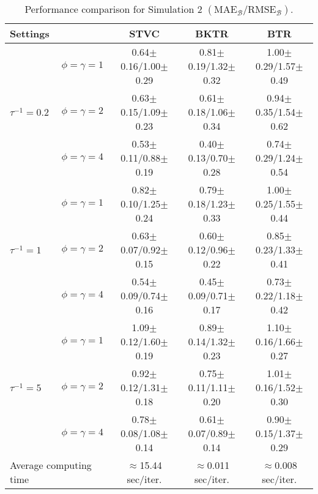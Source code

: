 \documentclass[12pt]{article}
\begin{document}
\begin{table}[!t]
\footnotesize
    \centering
    \caption{{Performance comparison for Simulation 2 $\left(\text{MAE}_{\boldsymbol{\mathcal{B}}}/\text{RMSE}_{\boldsymbol{\mathcal{B}}}\right)$.}}
    \begin{tabular}{ll|ccc}
    \toprule
    Settings & & STVC & BKTR  & BTR \\
    \midrule
    \multirow{3}{*}{$\tau^{-1}=0.2$} & $\phi=\gamma=1$ & 0.64$\pm$0.16/1.00$\pm$0.29 & 0.81$\pm$0.19/1.32$\pm$0.32 & 1.00$\pm$0.29/1.57$\pm$0.49 \\
    & $\phi=\gamma=2$ & 0.63$\pm$0.15/1.09$\pm$0.23 & 0.61$\pm$0.18/1.06$\pm$0.34 & 0.94$\pm$0.35/1.54$\pm$0.62  \\
    & $\phi=\gamma=4$ & 0.53$\pm$0.11/0.88$\pm$0.19 & 0.40$\pm$0.13/0.70$\pm$0.28 & 0.74$\pm$0.29/1.24$\pm$0.54 \\
    \cmidrule(r){1-5}
    \multirow{3}{*}{$\tau^{-1}=1$} & $\phi=\gamma=1$ & 0.82$\pm$0.10/1.25$\pm$0.24 & 0.79$\pm$0.18/1.23$\pm$0.33 & 1.00$\pm$0.25/1.55$\pm$0.44 \\
    & $\phi=\gamma=2$ & 0.63$\pm$0.07/0.92$\pm$0.15 & 0.60$\pm$0.12/0.96$\pm$0.22 & 0.85$\pm$0.23/1.33$\pm$0.41 \\
    & $\phi=\gamma=4$ & 0.54$\pm$0.09/0.74$\pm$0.16 & 0.45$\pm$0.09/0.71$\pm$0.17 & 0.73$\pm$0.22/1.18$\pm$0.42 \\
    \cmidrule(r){1-5}
    \multirow{3}{*}{$\tau^{-1}=5$} & $\phi=\gamma=1$ & 1.09$\pm$0.12/1.60$\pm$0.19 & 0.89$\pm$0.14/1.32$\pm$0.23 & 1.10$\pm$0.16/1.66$\pm$0.27 \\
    & $\phi=\gamma=2$ & 0.92$\pm$0.12/1.31$\pm$0.18 & 0.75$\pm$0.11/1.11$\pm$0.20 & 1.01$\pm$0.16/1.52$\pm$0.30 \\
    & $\phi=\gamma=4$ & 0.78$\pm$0.08/1.08$\pm$0.14 & 0.61$\pm$0.07/0.89$\pm$0.14 & 0.90$\pm$0.15/1.37$\pm$0.29 \\
    \cmidrule(r){1-5}
    \multicolumn{2}{l|}{Average computing time} & $\approx$15.44 sec/iter. & $\approx$0.011 sec/iter. & $\approx$0.008 sec/iter. \\
    \bottomrule
    \end{tabular}
    \label{tab:simu2}
\end{table}
\end{document}
